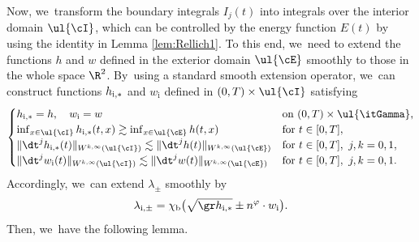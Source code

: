 Now, we~transform the boundary integrals $I_j(t)$ into integrals over the interior domain $\ul{\cI}$, which can be controlled by the energy function $E(t)$
by using the identity in Lemma \ref{lem:Rellich1}.
To this end, we~need to extend the functions $h$ and $w$ defined in the exterior domain $\ul{\cE}$ smoothly to those in the whole space $\R^2$. By~using a standard smooth extension operator, we~can construct functions $h_{{\rm i},*}$ and $w_\mathrm{i}$ defined in $(0,T)\times\ul{\cI}$ satisfying
\begin{equation}\label{Ext2}
\begin{cases}
h_{{\rm i},*}=h, \quad w_\mathrm{i}=w &\text{on } (0,T)\times\ul{\itGamma}, \\
\inf_{x\in\ul{\cI}}h_{{\rm i},*}(t,x) \gtrsim \inf_{x\in\ul{\cE}}h(t,x) &\text{for } t\in[0,T], \\
\|\dt^jh_{{\rm i},*}(t)\|_{W^{k,\infty}(\ul{\cI})} \lesssim \|\dt^jh(t)\|_{W^{k,\infty}(\ul{\cE})} &\text{for } t\in[0,T], \ j,k=0,1, \\
\|\dt^jw_\mathrm{i}(t)\|_{W^{k,\infty}(\ul{\cI})} \lesssim \|\dt^jw(t)\|_{W^{k,\infty}(\ul{\cE})} &\text{for } t\in[0,T], \ j,k=0,1.
\end{cases}
\end{equation}
Accordingly, we~can extend $\lambda_{\pm}$ smoothly by
\[
\lambda_{{\rm i},\pm} = \chi_\mathrm{b} \bigl(\sqrt{\gr h_{{\rm i},*}}\pm n^\varphi\cdot w_\mathrm{i} \bigr).
\]
Then, we~have the following lemma.

